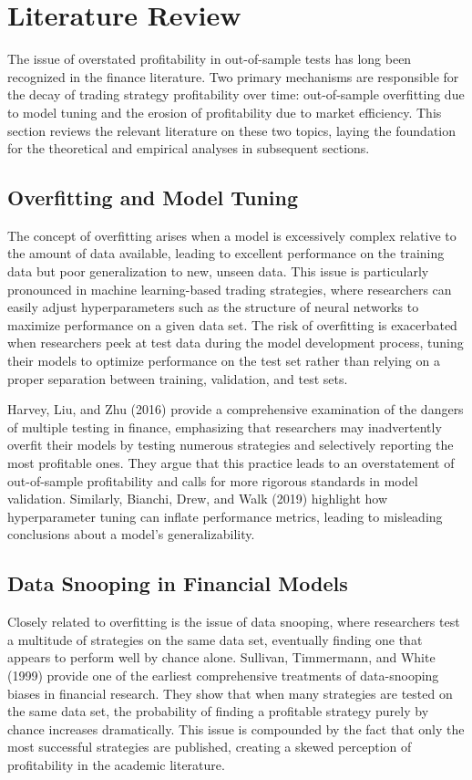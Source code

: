 \section{Literature Review}

The issue of overstated profitability in out-of-sample tests has long been recognized in the finance literature. Two primary mechanisms are responsible for the decay of trading strategy profitability over time: out-of-sample overfitting due to model tuning and the erosion of profitability due to market efficiency. This section reviews the relevant literature on these two topics, laying the foundation for the theoretical and empirical analyses in subsequent sections.

\subsection{Overfitting and Model Tuning}

The concept of overfitting arises when a model is excessively complex relative to the amount of data available, leading to excellent performance on the training data but poor generalization to new, unseen data. This issue is particularly pronounced in machine learning-based trading strategies, where researchers can easily adjust hyperparameters such as the structure of neural networks to maximize performance on a given data set. The risk of overfitting is exacerbated when researchers peek at test data during the model development process, tuning their models to optimize performance on the test set rather than relying on a proper separation between training, validation, and test sets.

Harvey, Liu, and Zhu (2016) provide a comprehensive examination of the dangers of multiple testing in finance, emphasizing that researchers may inadvertently overfit their models by testing numerous strategies and selectively reporting the most profitable ones. They argue that this practice leads to an overstatement of out-of-sample profitability and calls for more rigorous standards in model validation. Similarly, Bianchi, Drew, and Walk (2019) highlight how hyperparameter tuning can inflate performance metrics, leading to misleading conclusions about a model's generalizability.

\subsection{Data Snooping in Financial Models}

Closely related to overfitting is the issue of data snooping, where researchers test a multitude of strategies on the same data set, eventually finding one that appears to perform well by chance alone. Sullivan, Timmermann, and White (1999) provide one of the earliest comprehensive treatments of data-snooping biases in financial research. They show that when many strategies are tested on the same data set, the probability of finding a profitable strategy purely by chance increases dramatically. This issue is compounded by the fact that only the most successful strategies are published, creating a skewed perception of profitability in the academic literature.

